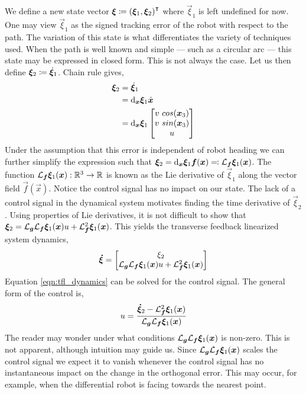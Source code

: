 \documentclass[oneside, 11pt]{book}
\begin{document}
We define a new state vector $\bm{\xi} \coloneqq {(\bm{\xi}_1, \bm{\xi}_2)}^{\intercal}$ where $\vec{\xi}_1$ is left undefined for now. One may view $\vec{\xi}_1$ as the signed tracking error of the robot with respect to the path. The variation of this state is what differentiates the variety of techniques used. When the path is well known and simple --- such as a circular arc --- this state may be expressed in closed form. This is not always the case. Let us then define $\bm{\xi}_2 \coloneqq \dot{\bm{\xi}}_1$. Chain rule gives,
\begin{align*}
    \bm{\xi}_2     &=  \dot{\bm{\xi}}_1\\
                    &=  \mathop{}\!\mathrm{d}_{\bm{x}}\bm{\xi}_1 \dot{\bm{x}}\\
                    &=  \mathop{}\!\mathrm{d}_{\bm{x}}\bm{\xi}_1
                        \begin{bmatrix}
                            v~cos(\bm{x}_3)\\
                            v~sin(\bm{x}_3)\\
                            u
                        \end{bmatrix}
\end{align*}
Under the assumption that this error is independent of robot heading we can further simplify the expression such that $\bm{\xi}_2=\mathop{}\!\mathrm{d}_{\bm{x}}\bm{\xi}_1 \bm{f}(\bm{x}) \eqqcolon \mathcal{L}_{\bm{f}}\bm{\xi}_1(\bm{x})$. The function $\mathcal{L}_{\bm{f}}\bm{\xi}_1(\bm{x}) : \mathbb{R}^3\to\mathbb{R}$ is known as the Lie derivative of $\vec{\xi}_1$ along the vector field $\vec{f}(\vec{x})$. Notice the control signal has no impact on our state. The lack of a control signal in the dynamical system motivates finding the time derivative of $\vec{\xi}_2$. Using properties of Lie derivatives, it is not difficult to show that $\bm{\xi}_2=\mathcal{L}_{\bm{g}}\mathcal{L}_{\bm{f}}\bm{\xi}_1(\bm{x}) u + \mathcal{L}_{\bm{f}}^2 \bm{\xi}_1(\bm{x})$. This yields the transverse feedback linearized system dynamics,
\begin{equation}
    \bm{\dot{\xi}}
    =
    \begin{bmatrix}
        \xi_2 \\
        \mathcal{L}_{\bm{g}}\mathcal{L}_{\bm{f}}\bm{\xi}_1(\bm{x}) u + \mathcal{L}_{\bm{f}}^2 \bm{\xi}_1(\bm{x})
    \end{bmatrix}
    \label{eqn:tfl_dynamics}
\end{equation}
Equation \ref{eqn:tfl_dynamics} can be solved for the control signal. The general form of the control is,
\begin{equation}
    u = \frac{ \bm{\dot{\xi}}_2 - \mathcal{L}_{\bm{f}}^2 \bm{\xi}_1(\bm{x}) }{ \mathcal{L}_{\bm{g}}\mathcal{L}_{\bm{f}}\bm{\xi}_1(\bm{x}) } \label{eqn:tfl_general_control}
\end{equation}
The reader may wonder under what conditions $\mathcal{L}_{\bm{g}}\mathcal{L}_{\bm{f}}\bm{\xi}_1(\bm{x})$ is non-zero. This is not apparent, although intuition may guide us. Since $\mathcal{L}_{\bm{g}}\mathcal{L}_{\bm{f}}\bm{\xi}_1(\bm{x})$ scales the control signal we expect it to vanish whenever the control signal has no instantaneous impact on the change in the orthogonal error. This may occur, for example, when the differential robot is facing towards the nearest point.
\end{document}
